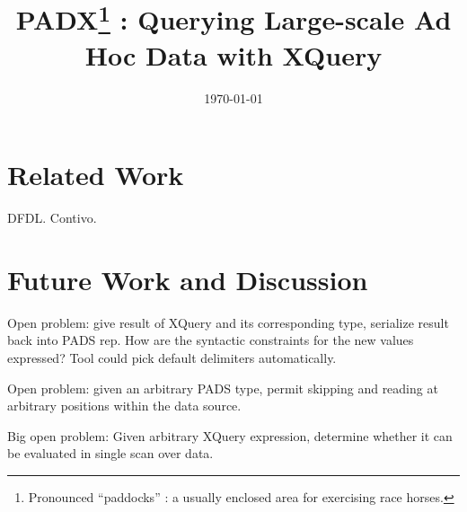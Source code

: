 \documentclass[preprint]{sigplanconf}
\title{PADX\footnote{Pronounced ``paddocks'' : a usually enclosed area
for exercising race horses.} : Querying Large-scale Ad Hoc Data with XQuery}
\date{\today}
\begin{document}
\maketitle
\begin{abstract}
\end{abstract}







\section{Related Work}
\label{section:relatedwork}

DFDL. Contivo. 

\section{Future Work and Discussion}
\label{section:future}
Open problem: give result of XQuery and its corresponding type,
serialize result back into PADS rep.  How are the syntactic
constraints for the new values expressed?  Tool could pick default
delimiters automatically. 

Open problem: given an arbitrary PADS type, permit skipping and
reading at arbitrary positions within the data source. 

Big open problem: Given arbitrary XQuery expression, determine whether
it can be evaluated in single scan over data.  


\small
 
\end{document}
